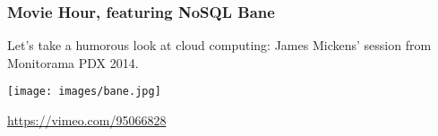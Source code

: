 \begin{frame}
\frametitle{Movie Hour, featuring NoSQL Bane}

Let's take a humorous look at cloud computing: James Mickens' session from Monitorama PDX 2014. 

\begin{center}
	\texttt{[image: images/bane.jpg]}
\end{center}

\begin{center}
\url{https://vimeo.com/95066828}
\end{center}


\end{frame}



